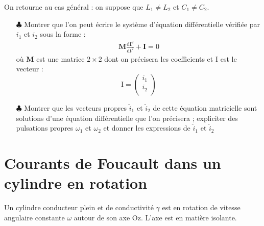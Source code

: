 \documentclass{report}
\begin{document}
On retourne au cas général : on suppose que $L_1\neq L_2$ et $C_1\neq C_2$. 

\begin{itemize}

	\item[$\clubsuit$] Montrer que l'on peut écrire le système d'équation différentielle vérifiée par $i_1$ et $i_2$ sous la forme : 
	\begin{align*}
		\mathrm{\textbf{M}}\frac{\mathrm{d\textbf{I}}^2}{\mathrm{dt}^2}+\mathrm{\textbf{I}}=0
	\end{align*}
	où $\mathrm{\textbf{M}}$ est une matrice $2\times2$ dont on précisera les coefficients et $\mathrm{I}$ est le vecteur :
		\begin{equation}
	\mathrm{I}=
	\left(
	\begin{array}{ccc}
	i_1\\
	i_2\\
	\end{array}\right)
	\end{equation}		

	\item[$\clubsuit$] Montrer que les vecteurs propres $\hat{i}_1$ et $\hat{i}_2$ de cette équation matricielle sont solutions d'une équation différentielle que l'on précisera ; expliciter des pulsations propres $\omega_1$ et $\omega_2$ et donner les expressions de $\hat{i}_1$ et $\hat{i}_2$

\end{itemize}

\newpage

\section*{Courants de Foucault dans un cylindre en rotation}

Un cylindre conducteur plein et de conductivité $\gamma$ est en rotation de vitesse angulaire constante $\omega$ autour de son axe Oz. L'axe est en matière isolante.
\vspace{0.5cm}
\end{document}
